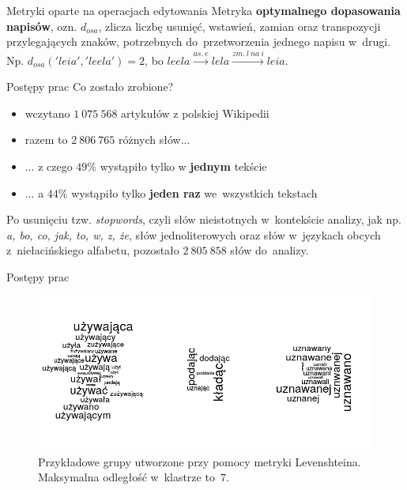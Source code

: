\documentclass[11pt,pdftex,mathserif]{beamer}\usepackage[]{graphicx}\usepackage[]{color}
\theoremstyle{definition}
\begin{document}
\begin{frame}{Metryki oparte na operacjach edytowania}
Metryka \textbf{optymalnego dopasowania napisów}, ozn. $d_{osa}$, zlicza liczbę usunięć, wstawień, zamian oraz transpozycji przylegających znaków, potrzebnych do~przetworzenia jednego napisu w~drugi. Np. $d_{osa}('leia', 'leela') = 2$, bo $leela  \xrightarrow{us.\ e} lela  \xrightarrow{zm.\ l\ na\ i} leia$. \\
\end{frame}

\begin{frame}{Postępy prac}
Co zostało zrobione?\\
\begin{itemize}
\item wczytano $1\ 075 \ 568$ artykułów z polskiej Wikipedii \pause
\item razem to $2\ 806\ 765$ różnych słów... \pause
\item ... z czego $49\%$ wystąpiło tylko w \textbf{jednym} tekście
\item ... a $44\%$ wystąpiło tylko \textbf{jeden raz} we~wszystkich tekstach
\end{itemize}
\pause
Po usunięciu tzw. \emph{stopwords}, czyli słów nieistotnych w~kontekście analizy, jak np. \emph{a, bo, co, jak, to, w, z, że}, słów jednoliterowych oraz słów w~językach obcych z~niełacińskiego alfabetu, pozostało $2\ 805\ 858$ słów do~analizy.\\
\end{frame}



\begin{frame}{Postępy prac}
\begin{figure}[h]
      \centering
      \includegraphics[width=12cm] {lv}
      \caption{Przykładowe grupy utworzone przy pomocy metryki Levenshteina. Maksymalna odległość w~klastrze to~$7$.}
    \end{figure}
\end{frame}
\end{document}
